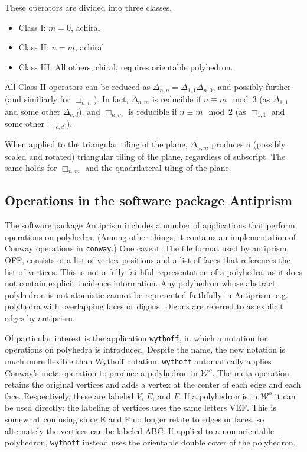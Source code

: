 \documentclass{amsart}[12pt]
\begin{document}
These operators are divided into three classes.
\begin{itemize}
  \item Class I: $m = 0$, achiral
  \item Class II: $n = m$, achiral
  \item Class III: All others, chiral, requires orientable polyhedron.
\end{itemize}
All Class II operators can be reduced as
$\Delta_{n,n} = \Delta_{1,1}\Delta_{n,0}$, and possibly further (and similiarly
for $\Box_{n,n}$). In fact, $\Delta_{n,m}$ is reducible if $n \equiv m \mod 3$
(as $\Delta_{1,1}$ and some other $\Delta_{c,d}$), and $\Box_{n,m}$ is
reducible if $n \equiv m \mod 2$ (as $\Box_{1,1}$ and some other $\Box_{c,d}$).

When applied to the triangular tiling of the plane, $\Delta_{n,m}$ produces a
(possibly scaled and rotated) triangular tiling of the plane, regardless of
subscript. The same holds for $\Box_{n,m}$ and the quadrilateral tiling of the
plane.

\subsection{Operations in the software package Antiprism}

The software package Antiprism \cite{antiprism} includes a number of
applications that perform operations on polyhedra. (Among other things, it
contains an implementation of Conway operations in \texttt{conway}.) One
caveat: The file format used by antiprism, OFF, consists of a list of vertex
positions and a list of faces that references the list of vertices. This is
not a fully faithful representation of a polyhedra, as it does not contain
explicit incidence information. Any polyhedron whose abstract polyhedron is
not atomistic cannot be represented faithfully in Antiprism: e.g. polyhedra
with overlapping faces or digons. Digons are referred to as explicit edges by
antiprism.

Of particular interest is the application \texttt{wythoff}, in which a notation
for operations on polyhedra is introduced. Despite the name, the new notation
is much more flexible than Wythoff notation. \texttt{wythoff} automatically
applies Conway's meta operation to produce a polyhedron in $\mathcal{W}^o$. The
meta operation retains the original vertices and adds a vertex at the center of
each edge and each face. Respectively, these are labeled $V$, $E$, and $F$. If
a polyhedron is in $\mathcal{W}^o$ it can be used directly: the labeling of
vertices uses the same letters VEF. This is somewhat confusing since E and F no
longer relate to edges or faces, so alternately the vertices can be labeled
ABC. If applied to a non-orientable polyhedron, \texttt{wythoff} instead uses
the orientable double cover of the polyhedron.
\end{document}
